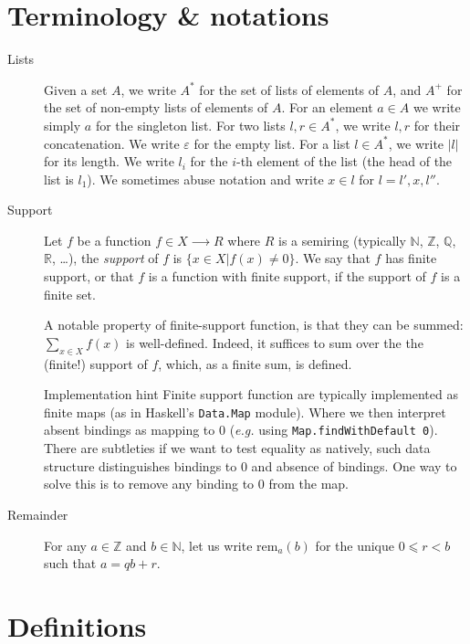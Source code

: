 \documentclass{article}
\newenvironment{implementationhint}{\begin{bclogo}[noborder=true,
    logo=\bccrayon, epBarre=3, couleurBarre=PineGreen]{Implementation hint}}{\end{bclogo}}
\newcommand{\lists}[1]{{#1}^*}
\newcommand{\nelists}[1]{{#1}^+}
\newcommand{\emptylist}{ε}
\newcommand{\pos}[2]{{#2}_{#1}}
\newcommand{\length}[1]{|#1|}
\newcommand{\rem}[2]{\mathrm{rem}_{#1}(#2)}
\begin{document}
\section{Terminology \& notations}
\label{sec:notations}

\begin{description}
\item[Lists] Given a set $A$, we write $\lists{A}$ for the set of lists of
  elements of $A$, and $\nelists{A}$ for the set of non-empty lists of elements
  of $A$. For an element $a∈A$ we write simply $a$ for the singleton list. For
  two lists $l,r∈\lists{A}$, we write $l,r$ for their concatenation. We write
  $\emptylist$ for the empty list. For a list $l∈\lists{A}$, we write
  $\length{l}$ for its length. We write $\pos{i}{l}$ for the $i$-th element of
  the list (the head of the list is $\pos{1}{l}$). We sometimes abuse notation
  and write $x∈l$ for $l = l',x,l''$.

\item[Support] Let $f$ be a function $f∈X⟶R$ where $R$ is a semiring
  (typically $ℕ$, $ℤ$, $ℚ$, $ℝ$, …), the \emph{support} of $f$ is
  $\{ x∈X | f(x)≠0 \}$. We say that $f$ has finite support, or that
  $f$ is a function with finite support, if the support of $f$ is
  a finite set.

  A notable property of finite-support function, is that they can be
  summed: $∑_{x∈X}f(x)$ is well-defined. Indeed, it suffices to sum
  over the the (finite!) support of $f$, which, as a finite sum, is
  defined.

  \begin{implementationhint}
    Finite support function are typically implemented as finite maps
    (as in Haskell's \verb+Data.Map+ module). Where we then interpret
    absent bindings as mapping to $0$ (\emph{e.g.} using
    \verb+Map.findWithDefault 0+). There are subtleties if we want to
    test equality as natively, such data structure distinguishes
    bindings to $0$ and absence of bindings. One way to solve this is
    to remove any binding to $0$ from the map.
  \end{implementationhint}
\item[Remainder] For any $a∈ℤ$ and $b∈ℕ$, let us write $\rem{a}{b}$
  for the unique $0⩽r<b$ such that $a=qb+r$.
\end{description}

\section{Definitions}
\label{sec:definitions}
\end{document}
